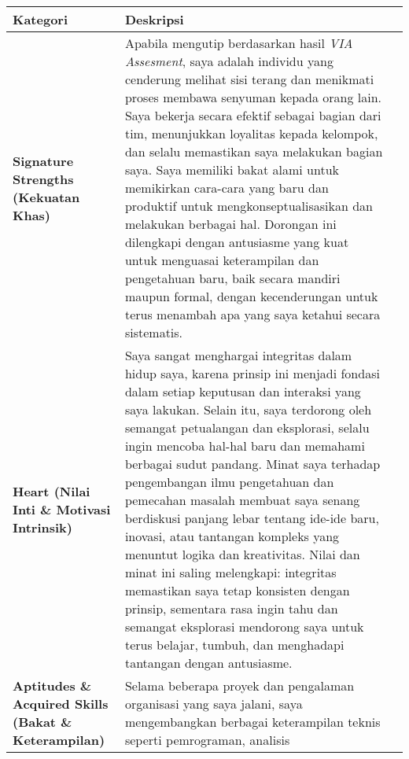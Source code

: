\documentclass[
  letterpaper,
  DIV=11,
  numbers=noendperiod]{scrreprt}
\begin{document}
\begin{longtable}[]{@{}
  >{\raggedright\arraybackslash}p{}
  >{\raggedright\arraybackslash}p{}
  >{\raggedright\arraybackslash}p{}@{}}
\toprule\noalign{}
\begin{minipage}[b]{\linewidth}\raggedright
Kategori
\end{minipage} & \begin{minipage}[b]{\linewidth}\raggedright
Deskripsi
\end{minipage} & \begin{minipage}[b]{\linewidth}\raggedright
\end{minipage} \\
\midrule\noalign{}
\endhead
\bottomrule\noalign{}
\endlastfoot
\textbf{Signature Strengths (Kekuatan Khas)} & Apabila mengutip
berdasarkan hasil \emph{VIA Assesment}, saya adalah individu yang
cenderung melihat sisi terang dan menikmati proses membawa senyuman
kepada orang lain. Saya bekerja secara efektif sebagai bagian dari tim,
menunjukkan loyalitas kepada kelompok, dan selalu memastikan saya
melakukan bagian saya. Saya memiliki bakat alami untuk memikirkan
cara-cara yang baru dan produktif untuk mengkonseptualisasikan dan
melakukan berbagai hal. Dorongan ini dilengkapi dengan antusiasme yang
kuat untuk menguasai keterampilan dan pengetahuan baru, baik secara
mandiri maupun formal, dengan kecenderungan untuk terus menambah apa
yang saya ketahui secara sistematis. & \\
\textbf{Heart (Nilai Inti \& Motivasi Intrinsik)} & Saya sangat
menghargai integritas dalam hidup saya, karena prinsip ini menjadi
fondasi dalam setiap keputusan dan interaksi yang saya lakukan. Selain
itu, saya terdorong oleh semangat petualangan dan eksplorasi, selalu
ingin mencoba hal-hal baru dan memahami berbagai sudut pandang. Minat
saya terhadap pengembangan ilmu pengetahuan dan pemecahan masalah
membuat saya senang berdiskusi panjang lebar tentang ide-ide baru,
inovasi, atau tantangan kompleks yang menuntut logika dan kreativitas.
Nilai dan minat ini saling melengkapi: integritas memastikan saya tetap
konsisten dengan prinsip, sementara rasa ingin tahu dan semangat
eksplorasi mendorong saya untuk terus belajar, tumbuh, dan menghadapi
tantangan dengan antusiasme. & \\
\textbf{Aptitudes \& Acquired Skills (Bakat \& Keterampilan)} & Selama
beberapa proyek dan pengalaman organisasi yang saya jalani, saya
mengembangkan berbagai keterampilan teknis seperti pemrograman, analisis

\end{longtable}
\end{document}
